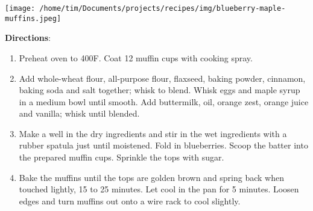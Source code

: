 \documentclass[11pt, twoside, openany]{book}
\begin{document}
\begin{minipage}[t]{\linewidth}
\begin{minipage}[t]{0.18\linewidth}
\centering \strut\vspace*{-\baselineskip}\newline
\texttt{[image: /home/tim/Documents/projects/recipes/img/blueberry-maple-muffins.jpeg]}\\
\end{minipage}\vspace{3mm}
\textbf{Directions}:
\vspace{-3mm}\begin{enumerate}\setlength\itemsep{-1mm}
\item Preheat oven to 400F. Coat 12 muffin cups with cooking spray.
\item Add whole-wheat flour, all-purpose flour, flaxseed, baking powder, cinnamon, baking soda and salt together; whisk to blend. Whisk eggs and maple syrup in a medium bowl until smooth. Add buttermilk, oil, orange zest, orange juice and vanilla; whisk until blended.
\item Make a well in the dry ingredients and stir in the wet ingredients with a rubber spatula just until moistened. Fold in blueberries. Scoop the batter into the prepared muffin cups. Sprinkle the tops with sugar.
\item Bake the muffins until the tops are golden brown and spring back when touched lightly, 15 to 25 minutes. Let cool in the pan for 5 minutes. Loosen edges and turn muffins out onto a wire rack to cool slightly.
\end{enumerate}
\end{minipage}\vspace{8mm}
\end{document}

